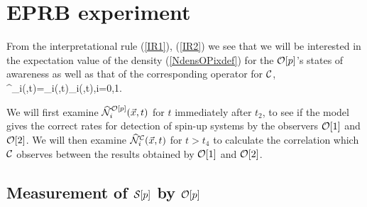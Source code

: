 \documentclass[12pt]{article}
\begin{document}
\section{EPRB experiment}\label{SecEPRB}

From the interpretational rule (\ref{IR1}), (\ref{IR2}) we see that we will be interested in
the expectation value of the density  (\ref{NdensOPixdef}) for the $\cO[p]$\/'s states of awareness as well as that of the
corresponding operator for $\cC$\/,
\be
\wh{\cN}^\cC_i(,t)=\wh{\xi}\da_i(,t)\;\wh{\xi}_i(,t),\hsp i=0,1.\label{NCi}
\ee
{}

We will first examine $\wh{\cN}^{\cO[p]}_i(\vec{x},t)$\/ for $t$\/ immediately after $t_2$\/, to see if the model gives
the correct rates for detection of spin-up systems by  the observers $\cO[1]$\/ and $\cO[2]$\/. We will then examine
$\wh{\cN}^\cC_i(\vec{x},t)$\/ for $t > t_4$\/ to calculate the correlation which $\cC$\/ observes between the results
obtained by  $\cO[1]$\/ and $\cO[2]$\/.

\subsection{Measurement of $\cS[p]$\/ by $\cO[p]$\/}\label{SecMeasurementSbyO}
\end{document}
